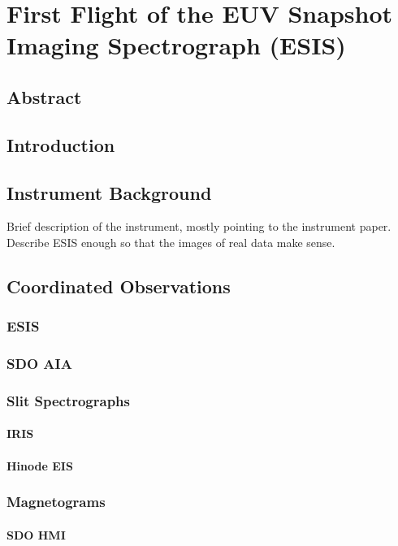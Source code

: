 \chapter{First Flight of the EUV Snapshot Imaging Spectrograph (ESIS)}

\section{Abstract}

\section{Introduction}

\section{Instrument Background}
Brief description of the instrument, mostly pointing to the instrument paper.  Describe ESIS enough so that the images of real data make sense. 


\section{Coordinated Observations}
\subsection{ESIS}

\subsection{SDO AIA}

\subsection{Slit Spectrographs}
\subsubsection{IRIS}
\subsubsection{Hinode EIS}

\subsection{Magnetograms}
\subsubsection{SDO HMI}
